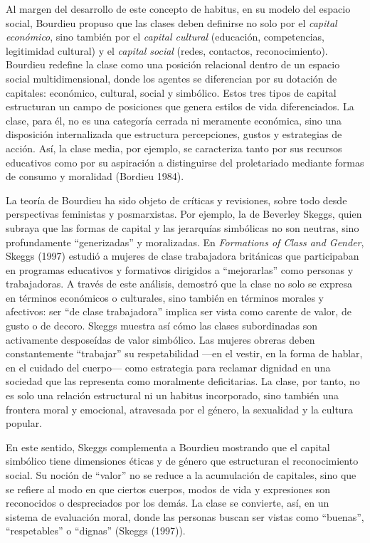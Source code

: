 \documentclass[
  spanish,
  letterpaper,
  DIV=11,
  numbers=noendperiod]{scrreprt}
\begin{document}
Al margen del desarrollo de este concepto de habitus, en su modelo del
espacio social, Bourdieu propuso que las clases deben definirse no solo
por el \emph{capital económico}, sino también por el \emph{capital
cultural} (educación, competencias, legitimidad cultural) y el
\emph{capital social} (redes, contactos, reconocimiento). Bourdieu
redefine la clase como una posición relacional dentro de un espacio
social multidimensional, donde los agentes se diferencian por su
dotación de capitales: económico, cultural, social y simbólico. Estos
tres tipos de capital estructuran un campo de posiciones que genera
estilos de vida diferenciados. La clase, para él, no es una categoría
cerrada ni meramente económica, sino una disposición internalizada que
estructura percepciones, gustos y estrategias de acción. Así, la clase
media, por ejemplo, se caracteriza tanto por sus recursos educativos
como por su aspiración a distinguirse del proletariado mediante formas
de consumo y moralidad (Bordieu 1984).

La teoría de Bourdieu ha sido objeto de críticas y revisiones, sobre
todo desde perspectivas feministas y posmarxistas. Por ejemplo, la de
Beverley Skeggs, quien subraya que las formas de capital y las
jerarquías simbólicas no son neutras, sino profundamente ``generizadas''
y moralizadas. En \emph{Formations of Class and Gender}, Skeggs (1997)
estudió a mujeres de clase trabajadora británicas que participaban en
programas educativos y formativos dirigidos a ``mejorarlas'' como
personas y trabajadoras. A través de este análisis, demostró que la
clase no solo se expresa en términos económicos o culturales, sino
también en términos morales y afectivos: ser ``de clase trabajadora''
implica ser vista como carente de valor, de gusto o de decoro. Skeggs
muestra así cómo las clases subordinadas son activamente desposeídas de
valor simbólico. Las mujeres obreras deben constantemente ``trabajar''
su respetabilidad ---en el vestir, en la forma de hablar, en el cuidado
del cuerpo--- como estrategia para reclamar dignidad en una sociedad que
las representa como moralmente deficitarias. La clase, por tanto, no es
solo una relación estructural ni un habitus incorporado, sino también
una frontera moral y emocional, atravesada por el género, la sexualidad
y la cultura popular.

En este sentido, Skeggs complementa a Bourdieu mostrando que el capital
simbólico tiene dimensiones éticas y de género que estructuran el
reconocimiento social. Su noción de ``valor'' no se reduce a la
acumulación de capitales, sino que se refiere al modo en que ciertos
cuerpos, modos de vida y expresiones son reconocidos o despreciados por
los demás. La clase se convierte, así, en un sistema de evaluación
moral, donde las personas buscan ser vistas como ``buenas'',
``respetables'' o ``dignas'' (Skeggs (1997)).
\end{document}
